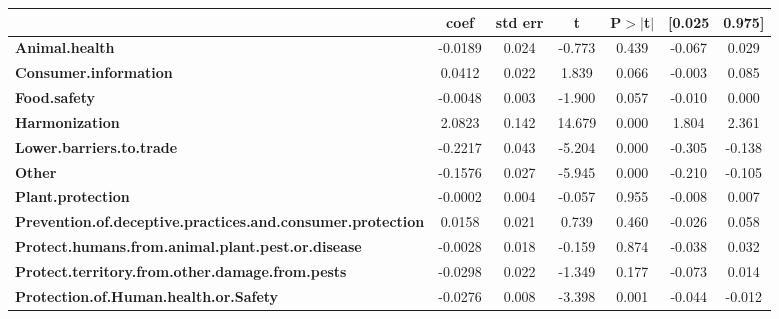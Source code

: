 \begin{center}
\begin{tabular}{lcccccc}
                                                                   & \textbf{coef} & \textbf{std err} & \textbf{t} & \textbf{P$> |$t$|$} & \textbf{[0.025} & \textbf{0.975]}  \\
\midrule
\textbf{Animal.health}                                             &      -0.0189  &        0.024     &    -0.773  &         0.439        &       -0.067    &        0.029     \\
\textbf{Consumer.information}                                      &       0.0412  &        0.022     &     1.839  &         0.066        &       -0.003    &        0.085     \\
\textbf{Food.safety}                                               &      -0.0048  &        0.003     &    -1.900  &         0.057        &       -0.010    &        0.000     \\
\textbf{Harmonization}                                             &       2.0823  &        0.142     &    14.679  &         0.000        &        1.804    &        2.361     \\
\textbf{Lower.barriers.to.trade}                                   &      -0.2217  &        0.043     &    -5.204  &         0.000        &       -0.305    &       -0.138     \\
\textbf{Other}                                                     &      -0.1576  &        0.027     &    -5.945  &         0.000        &       -0.210    &       -0.105     \\
\textbf{Plant.protection}                                          &      -0.0002  &        0.004     &    -0.057  &         0.955        &       -0.008    &        0.007     \\
\textbf{Prevention.of.deceptive.practices.and.consumer.protection} &       0.0158  &        0.021     &     0.739  &         0.460        &       -0.026    &        0.058     \\
\textbf{Protect.humans.from.animal.plant.pest.or.disease}          &      -0.0028  &        0.018     &    -0.159  &         0.874        &       -0.038    &        0.032     \\
\textbf{Protect.territory.from.other.damage.from.pests}            &      -0.0298  &        0.022     &    -1.349  &         0.177        &       -0.073    &        0.014     \\
\textbf{Protection.of.Human.health.or.Safety}                      &      -0.0276  &        0.008     &    -3.398  &         0.001        &       -0.044    &       -0.012     \\

\end{tabular}
\end{center}
